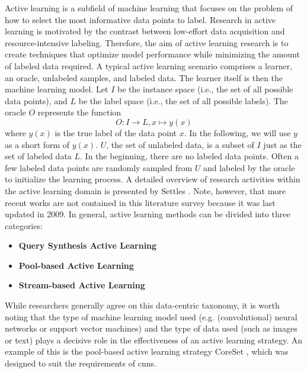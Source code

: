 Active learning is a subfield of machine learning that focuses on the problem of how to select the most informative data points to label.
Research in active learning is motivated by the contrast between low-effort data acquisition and resource-intensive labeling.
Therefore, the aim of active learning research is to create techniques that optimize model performance while minimizing the amount of
labeled data required. A typical active learning scenario comprises a learner, an oracle, unlabeled samples, and labeled data. The learner
itself is then the machine learning model. Let $I$ be the instance space (i.e., the set of all possible data points), and $L$ be the label
space (i.e., the set of all possible labels). The oracle $O$ represents the function
\begin{equation}
    O: I \rightarrow L, x \mapsto y(x)
\end{equation}
where $y(x)$ is the true label of the data point $x$. In the following, we will use $y$ as a short form of $y(x)$. $U$, the set of unlabeled data,
is a subset of $I$ just as the set of labeled data $L$. In the beginning, there are no labeled data points. Often a few labeled data points
are randomly sampled from $U$ and labeled by the oracle to initialize the learning process. A detailed overview of research activities within
the active learning domain is presented by Settles \cite{settles2009active}. Note, however, that more recent works are not contained in this
literature survey because it was last updated in 2009. In general, active learning methods can be divided into three categories:
\begin{itemize}
    \item \textbf{Query Synthesis Active Learning}
    \item \textbf{Pool-based Active Learning}
    \item \textbf{Stream-based Active Learning}
\end{itemize}
While researchers generally agree on this data-centric taxonomy, it is worth noting that the type of machine learning model used
(e.g. (convolutional) neural networks or support vector machines) and the type of data used (such as images or text) plays a decisive role in the
effectiveness of an active learning strategy. An example of this is the pool-based active learning strategy CoreSet \cite{sener2017active}, which
was designed to suit the requirements of \glspl{cnn}.


